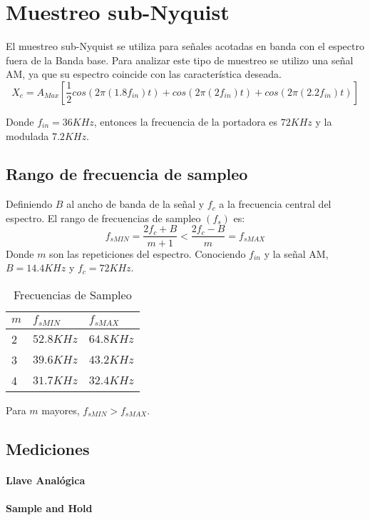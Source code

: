 \documentclass[../../ASSD_TP1_G7.tex]{subfiles}
\begin{document}
\chapter*{Muestreo sub-Nyquist}
El muestreo sub-Nyquist se utiliza para se\~nales acotadas en banda con el espectro fuera de la Banda base. Para analizar este tipo de muestreo se utilizo una se\~nal AM, ya que su espectro coincide con las característica deseada.
\begin{equation}
X_c=A_{Max}[\frac{1}{2}cos(2\pi (1.8 f_{in})t)+cos(2\pi (2 f_{in})t)+cos(2\pi (2.2 f_{in})t)]
\end{equation}\label{eq:inputSignlan}

Donde $f_{in}= 36KHz$, entonces la frecuencia de la portadora es $72KHz$ y la modulada $7.2KHz$.
\section*{Rango de frecuencia de sampleo}
Definiendo $B$ al ancho de banda de la se\~nal y $f_c$ a la frecuencia central del espectro. El rango de frecuencias de sampleo $(f_s)$ es:
\begin{equation}
f_{sMIN}=\frac{2f_c + B}{m+1} < \frac{2f_c - B}{m} = f_{sMAX}
\end{equation}
Donde $m$ son las repeticiones del espectro. Conociendo $f_{in}$ y la se\~nal AM, $B=14.4KHz$ y $f_c=72KHz$.

\begin{table}[htbp]
\begin{center}
\begin{tabular}{|l|l|l|}
\hline
$m$ & $f_{sMIN}$ & $f_{sMAX}$  \\
\hline \hline
2 & $52.8KHz$ & $64.8KHz$ \\ \hline
3 & $39.6KHz$ & $43.2KHz$ \\ \hline
4 & $31.7KHz$ & $32.4KHz$ \\ \hline
\end{tabular}
\caption{Frecuencias de Sampleo}
\label{tabla:fsamp}
\end{center}
\end{table}
Para $m$ mayores, $f_{sMIN}>f_{sMAX}$.
\section*{Mediciones}
\subsubsection{Llave Analógica}
\subsubsection{Sample and Hold}
\end{document}
